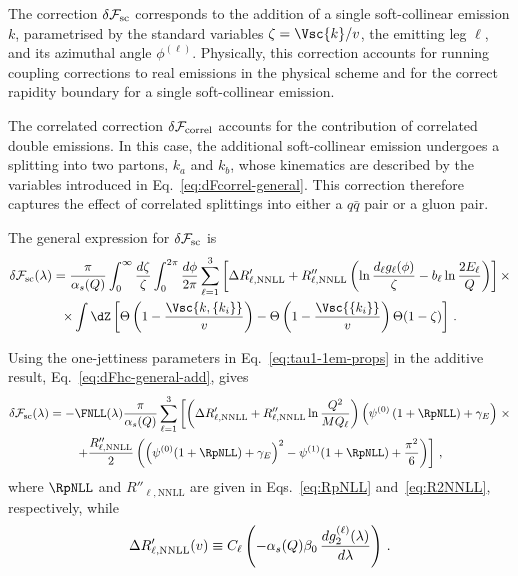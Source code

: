 The correction $\delta\mathcal{F}_{\rm sc}$ corresponds to the addition
of a single soft-collinear emission $k$, parametrised by the standard
variables $\zeta=\Vsc{k}/v$, the emitting leg $\ell$, and its azimuthal
angle $\phi^{(\ell)}$. Physically, this correction accounts for running
coupling corrections to real emissions in the physical scheme and for
the correct rapidity boundary for a single soft-collinear emission. 

The correlated correction $\delta\mathcal{F}_{\rm correl}$ accounts for
the contribution of correlated double emissions. In this case, the additional
soft-collinear emission undergoes a splitting into two partons,
$k_a$ and $k_b$, whose kinematics are described by the variables
introduced in Eq.~\eqref{eq:dFcorrel-general}. This correction therefore 
captures the effect of correlated splittings into either a $q\bar q$ pair or a gluon pair.

The general expression for $\delta\mathcal{F}_{\rm sc}$ is
\begin{multline}
	\label{eq:dFsc-general}
	\delta\mathcal{F}_{\mathrm{sc}}(\lambda)=\frac{\pi}{\alpha_s(Q)}\int_0^\infty\frac{d\zeta}{\zeta}\int_0^{2\pi}\frac{d\phi}{2\pi}\sum_{\ell=1}^3\left[\Delta R'_{\ell,\mathrm{NNLL}}+R''_{\ell,\mathrm{NNLL}}\left(\ln\frac{d_\ell g_\ell(\phi)}{\zeta}-b_\ell\ln\frac{2E_\ell}{Q}\right)\right]\times 
	 \\ \times \int \dZ  \left[\Theta\left(1-\frac{\Vsc{k,\{k_i\}}}{v}\right)
       -\Theta\left(1-\frac{\Vsc{\{k_i\}}}{v}\right)\Theta(1-\zeta)
     \right]\,.
\end{multline}

Using the one-jettiness parameters in Eq.~\eqref{eq:tau1-1em-props}
in the additive result, Eq.~\eqref{eq:dFhc-general-add}, gives
\begin{multline}
\delta\mathcal{F}_{\mathrm{sc}}(\lambda)=-\FNLL(\lambda)\frac{\pi}{\alpha_s(Q)}\sum_{\ell=1}^3\left[\left(\Delta R'_{\ell,\mathrm{NNLL}}+ R''_{\ell,\mathrm{NNLL}}\ln\frac{Q^2}{M Q_{\ell}}\right)\left(\psi^{(0)}\left(1+\RpNLL\right)+\gamma_E\right)\right. \times\\
 \left.+\frac{R''_{\ell,\mathrm{NNLL}}}{2}\left(\left(\psi^{(0)}(1+\RpNLL)+\gamma_E\right)^2-\psi^{(1)}(1+\RpNLL)+\frac{\pi^2}{6}\right)\right]\,,
\end{multline}
where $\RpNLL$ and $R''_{\ell,\mathrm{NNLL}}$ are given in
Eqs.~\eqref{eq:RpNLL} and~\eqref{eq:R2NNLL}, respectively, while
\begin{equation}
\label{eq:DRNNLL}
\Delta R'_{\ell,\rm NNLL}(v) \equiv C_\ell\left(-\alpha_s(Q)\beta_0\,\frac{dg_2^{(\ell)}(\lambda)}{d\lambda}\right)\,.
\end{equation}

